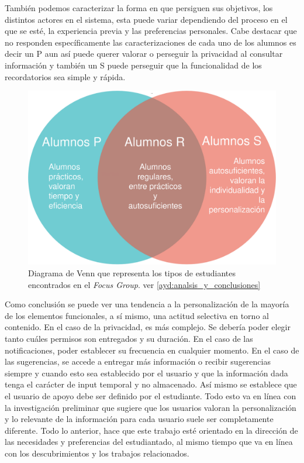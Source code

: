     \par También podemos caracterizar la forma en que persiguen sus objetivos, los distintos actores en el sistema, esta puede variar dependiendo del proceso en el que se esté, la experiencia previa y las preferencias personales. Cabe destacar que no responden específicamente las caracterizaciones de cada uno de los alumnos es decir un \acrshort{P} aun así puede querer valorar o perseguir la privacidad al consultar información y también un \acrshort{S} puede perseguir que la funcionalidad de los recordatorios sea simple y rápida.
    \begin{figure}[h]
        \centering
        \includegraphics[scale=0.2]{media/imagenes/focus_groups/Tipos_de_alumnos-Diagrama_de_Venn.png}
        \caption[Diagrama Tipos de alumnos]{Diagrama de Venn que representa los tipos de estudiantes encontrados en el \textit{Focus Group}. ver \ref{ayd:analsis_y_conclusiones}}
        \label{fig:alumnosVenn}
    \end{figure}
    \par Como conclusión se puede ver una tendencia a la personalización de la mayoría de los elementos funcionales, a sí mismo, una actitud selectiva en torno al contenido. En el caso de la privacidad, es más complejo. Se debería poder elegir tanto cuáles permisos son entregados y su duración. En el caso de las notificaciones, poder establecer su frecuencia en cualquier momento. En el caso de las sugerencias, se accede a entregar más información o recibir sugerencias siempre y cuando esto sea establecido por el usuario y que la información dada tenga el carácter de input temporal y no almacenado. Así mismo se establece que el usuario de apoyo debe ser definido por el estudiante. Todo esto va en línea con la investigación preliminar que sugiere que los usuarios valoran la personalización y lo relevante de la información para cada usuario suele ser completamente diferente. Todo lo anterior, hace que este trabajo esté orientado en la dirección de las necesidades y preferencias del estudiantado, al mismo tiempo que va en línea con los descubrimientos y los trabajos relacionados.

